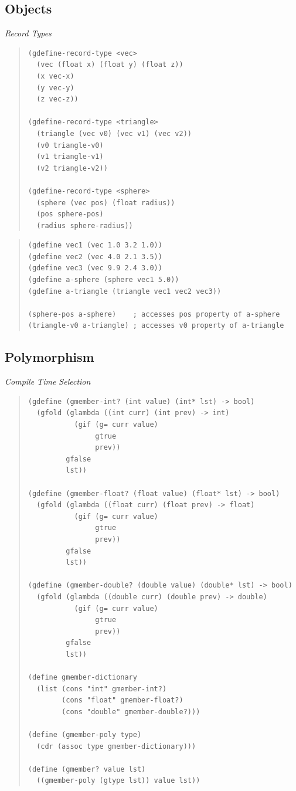 \documentclass{article}
\begin{document}
\subsection{Objects}

\raggedright{}{
{\emph{Record Types}}
}

\begin{quote}
\begin{verbatim}
(gdefine-record-type <vec>
  (vec (float x) (float y) (float z))
  (x vec-x)
  (y vec-y)
  (z vec-z))

(gdefine-record-type <triangle>
  (triangle (vec v0) (vec v1) (vec v2))
  (v0 triangle-v0)
  (v1 triangle-v1)
  (v2 triangle-v2))

(gdefine-record-type <sphere>
  (sphere (vec pos) (float radius))
  (pos sphere-pos)
  (radius sphere-radius))
\end{verbatim}
\end{quote}

\begin{quote}
\begin{verbatim}
(gdefine vec1 (vec 1.0 3.2 1.0))
(gdefine vec2 (vec 4.0 2.1 3.5))
(gdefine vec3 (vec 9.9 2.4 3.0))
(gdefine a-sphere (sphere vec1 5.0))
(gdefine a-triangle (triangle vec1 vec2 vec3))

(sphere-pos a-sphere)    ; accesses pos property of a-sphere
(triangle-v0 a-triangle) ; accesses v0 property of a-triangle
\end{verbatim}
\end{quote}

\subsection{Polymorphism}
{\emph{Compile Time Selection}}

\begin{quote}
\begin{verbatim}
(gdefine (gmember-int? (int value) (int* lst) -> bool)
  (gfold (glambda ((int curr) (int prev) -> int)
           (gif (g= curr value)
                gtrue
                prev))
         gfalse
         lst))

(gdefine (gmember-float? (float value) (float* lst) -> bool)
  (gfold (glambda ((float curr) (float prev) -> float)
           (gif (g= curr value)
                gtrue
                prev))
         gfalse
         lst))

(gdefine (gmember-double? (double value) (double* lst) -> bool)
  (gfold (glambda ((double curr) (double prev) -> double)
           (gif (g= curr value)
                gtrue
                prev))
         gfalse
         lst))

(define gmember-dictionary
  (list (cons "int" gmember-int?)
        (cons "float" gmember-float?)
        (cons "double" gmember-double?)))

(define (gmember-poly type)
  (cdr (assoc type gmember-dictionary)))

(define (gmember? value lst)
  ((gmember-poly (gtype lst)) value lst))

\end{verbatim}
\end{quote}
\end{document}
